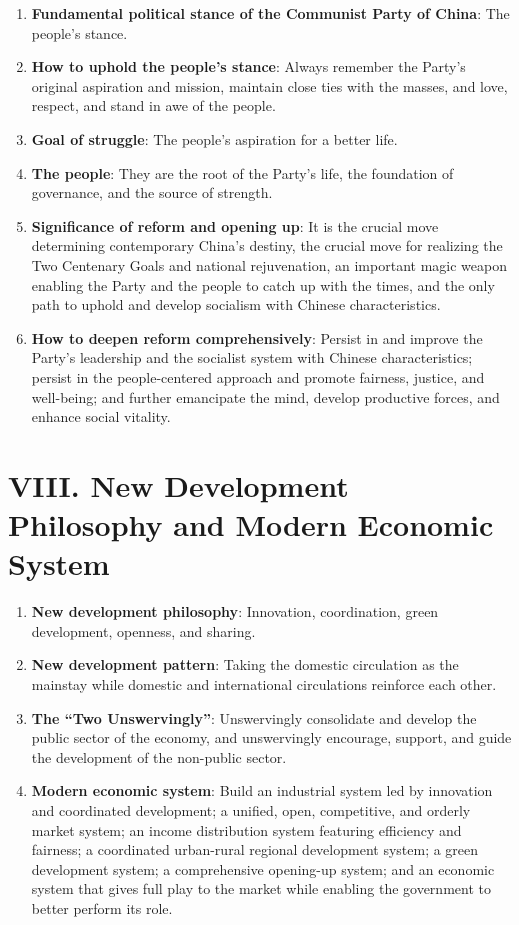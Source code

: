 \documentclass[11pt,a4paper]{ctexart}
\begin{document}
\begin{enumerate}[leftmargin=2em]
    \item \textbf{Fundamental political stance of the Communist Party of China}: The people's stance.
    \item \textbf{How to uphold the people's stance}: Always remember the Party's original aspiration and mission, maintain close ties with the masses, and love, respect, and stand in awe of the people.
    \item \textbf{Goal of struggle}: The people's aspiration for a better life.
    \item \textbf{The people}: They are the root of the Party's life, the foundation of governance, and the source of strength.
    \item \textbf{Significance of reform and opening up}: It is the crucial move determining contemporary China's destiny, the crucial move for realizing the Two Centenary Goals and national rejuvenation, an important magic weapon enabling the Party and the people to catch up with the times, and the only path to uphold and develop socialism with Chinese characteristics.
    \item \textbf{How to deepen reform comprehensively}: Persist in and improve the Party's leadership and the socialist system with Chinese characteristics; persist in the people-centered approach and promote fairness, justice, and well-being; and further emancipate the mind, develop productive forces, and enhance social vitality.
\end{enumerate}

\section{VIII. New Development Philosophy and Modern Economic System}

\begin{enumerate}[leftmargin=2em]
    \item \textbf{New development philosophy}: Innovation, coordination, green development, openness, and sharing.
    \item \textbf{New development pattern}: Taking the domestic circulation as the mainstay while domestic and international circulations reinforce each other.
    \item \textbf{The ``Two Unswervingly''}: Unswervingly consolidate and develop the public sector of the economy, and unswervingly encourage, support, and guide the development of the non-public sector.
    \item \textbf{Modern economic system}: Build an industrial system led by innovation and coordinated development; a unified, open, competitive, and orderly market system; an income distribution system featuring efficiency and fairness; a coordinated urban-rural regional development system; a green development system; a comprehensive opening-up system; and an economic system that gives full play to the market while enabling the government to better perform its role.
\end{enumerate}
\end{document}
